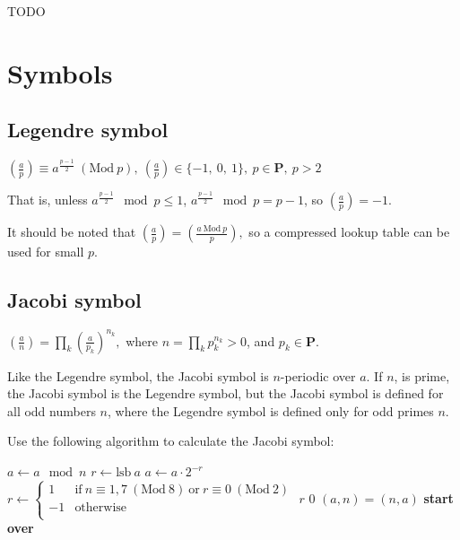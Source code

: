 TODO


\newpage
\section{Symbols}
\label{sec:Symbols}

\subsection{Legendre symbol}
\label{sec:Legendre symbol}

\( \displaystyle{
  \left ( \frac{a}{p} \right ) \equiv a^{\frac{p - 1}{2}} ~(\text{Mod}~p),~
  \left ( \frac{a}{p} \right ) \in \{-1,~0,~1\},~
  p \in \textbf{P},~ p > 2
}\)
\vspace{1em}

\noindent
That is, unless $\displaystyle{a^{\frac{p - 1}{2}} \mod p \le 1}$,
$\displaystyle{a^{\frac{p - 1}{2}} \mod p = p - 1}$, so
$\displaystyle{\left ( \frac{a}{p} \right ) = -1}$.

It should be noted that
\( \displaystyle{
  \left ( \frac{a}{p} \right ) = 
  \left ( \frac{a ~\text{Mod}~ p}{p} \right ),
}\)
so a compressed lookup table can be used for small $p$.


\subsection{Jacobi symbol}
\label{sec:Jacobi symbol}

\( \displaystyle{
  \left ( \frac{a}{n} \right ) = 
  \prod_k \left ( \frac{a}{p_k} \right )^{n_k},
}\)
where $\displaystyle{n = \prod_k p_k^{n_k} > 0}$,
and $p_k \in \textbf{P}$.
\vspace{1em}

Like the Legendre symbol, the Jacobi symbol is $n$-periodic over $a$.
If $n$, is prime, the Jacobi symbol is the Legendre symbol, but
the Jacobi symbol is defined for all odd numbers $n$, where the
Legendre symbol is defined only for odd primes $n$.

Use the following algorithm to calculate the Jacobi symbol:

\vspace{1em}
\hspace{-2.8ex}
\begin{minipage}{\linewidth}
\begin{algorithmic}
    \STATE $a \gets a \mod n$
    \STATE $r \gets \mbox{lsb}~ a$
    \STATE $a \gets a \cdot 2^{-r}$
    \STATE \(\displaystyle{
      r \gets \left \lbrace \begin{array}{rl}
        1 &
          \text{if}~ n \equiv 1, 7 ~(\text{Mod}~ 8)
          ~\text{or}~ r \equiv 0 ~(\text{Mod}~ 2) \\
        -1 & \text{otherwise} \\
      \end{array} \right .
    }\)
        \RETURN $r$
        \RETURN $0$
    \ENDIF
    \STATE $(a, n) = (n, a)$
    \STATE \textbf{start over}
\end{algorithmic}
\end{minipage}


